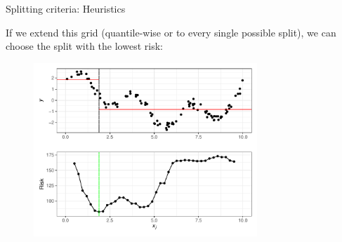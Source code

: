 \documentclass[11pt,compress,t,notes=noshow, xcolor=table]{beamer}
\begin{document}
\begin{vbframe}{Splitting criteria: Heuristics}

If we extend this grid (quantile-wise or to every single possible split), we can choose the split with the lowest risk:

\begin{figure}
\includegraphics[width=0.75\textwidth]{figure/splitcrit_optimal-constant-grid2.pdf} 
\end{figure}


\end{vbframe}
\end{document}
